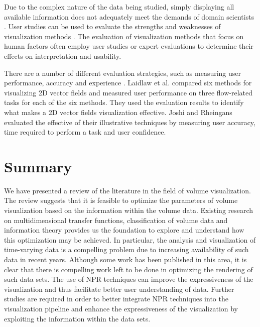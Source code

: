 Due to the complex nature of the data being studied, simply displaying all available information does not adequately meet the demands of domain scientists \cite{anderson_evaluating_2012}.
User studies can be used to evaluate the strengths and weaknesses of visualization methods \cite{christopher_thoughts_2003}.
The evaluation of visualization methods that focus on human factors often employ user studies or expert evaluations to determine their effects on interpretation and usability.

There are a number of different evaluation strategies, such as measuring user performance, accuracy and experience \cite{redmond_influencing_2010}. Laidlaw et al. \cite{laidlaw_quantitative_2001} compared six methods for visualizing 2D vector fields and measured user performance on three flow-related tasks for each of the six methods. They used the evaluation results to identify what makes a 2D vector fields visualization effective.
Joshi and Rheingans \cite{joshi_evaluation_2008} evaluated the effective of their illustrative techniques by measuring user accuracy, time required to perform a task and user confidence.

\section{Summary}
We have presented a review of the literature in the field of volume visualization.
The review suggests that it is feasible to optimize the parameters of volume visualization based on the information within the volume data. Existing research on multidimensional transfer functions, classification of volume data and information theory provides us the foundation to explore and understand how this optimization may be achieved.
In particular, the analysis and visualization of time-varying data is a compelling problem due to increasing availability of such data in recent years. Although some work has been published in this area, it is clear that there is compelling work left to be done in optimizing the rendering of such data sets.
The use of NPR techniques can improve the expressiveness of the visualization and thus facilitate better user understanding of data.
Further studies are required in order to better integrate NPR techniques into the visualization pipeline and enhance the expressiveness of the visualization by exploiting the information within the data sets.

